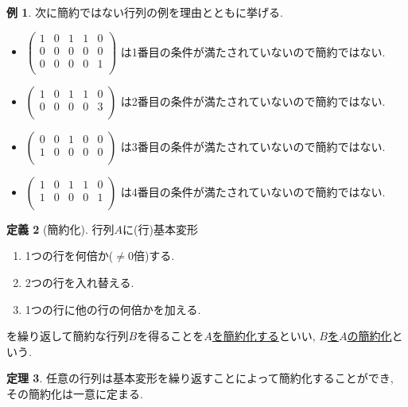 \documentclass[dvipdfmx,a4paper,11pt]{article}
\theoremstyle{definition}
\newtheorem{thm}{定理}
\newtheorem{dfn}[thm]{定義}
\newtheorem{exa}[thm]{例}
\begin{document}
 \begin{exa}
 次に簡約ではない行列の例を理由とともに挙げる.
 \begin{itemize}
\item 
$ 
\begin{pmatrix}
 1& 0& 1  & 1&0\\
 0& 0& 0  & 0&0\\
 0& 0& 0 & 0&1\\
 \end{pmatrix} 
 $
 は1番目の条件が満たされていないので簡約ではない.
 \item 
$ 
\begin{pmatrix}
 1& 0& 1  & 1&0\\
 0& 0& 0  & 0&3\\
 \end{pmatrix} 
 $
 は2番目の条件が満たされていないので簡約ではない.
 \item 
$ 
\begin{pmatrix}
 0& 0& 1  & 0&0\\
 1& 0& 0  & 0&0\\
 \end{pmatrix} 
 $
 は3番目の条件が満たされていないので簡約ではない.
 \item 
$ 
\begin{pmatrix}
 1& 0& 1  & 1&0\\
 1& 0& 0  & 0&1\\
 \end{pmatrix} 
 $
 は4番目の条件が満たされていないので簡約ではない.
 \end{itemize}
\end{exa}

\begin{tcolorbox}[
    colback = white,
    colframe = green!35!black,
    fonttitle = \bfseries,
    breakable = true]
    \begin{dfn}[簡約化]
  行列$A$に(行)基本変形
 \begin{enumerate}
 \item 1つの行を何倍か($\neq 0$倍)する.
 \item 2つの行を入れ替える.
 \item1つの行に他の行の何倍かを加える.
 \end{enumerate}
 を繰り返して簡約な行列$B$を得ることを\underline{$A$を簡約化する}といい, \underline{$B$を$A$の簡約化}という.
   \end{dfn}
 \end{tcolorbox}
 
 \begin{tcolorbox}[
    colback = white,
    colframe = green!35!black,
    fonttitle = \bfseries,
    breakable = true]
    \begin{thm}
    任意の行列は基本変形を繰り返すことによって簡約化することができ, その簡約化は一意に定まる.
   \end{thm}
 \end{tcolorbox}
 
\end{document}
